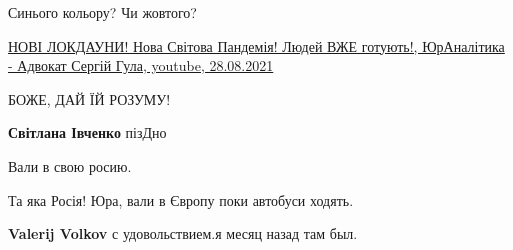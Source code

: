 \begin{itemize}
\begin{itemize}
Синього кольору?
Чи жовтого?
\end{itemize}

 
\href{https://youtu.be/nVaRQlgTcpk}{%
НОВІ ЛОКДАУНИ! Нова Світова Пандемія! Людей ВЖЕ готують!, %
ЮрАналітика - Адвокат Сергій Гула, youtube, 28.08.2021%
}

 
БОЖЕ, ДАЙ ЇЙ РОЗУМУ! 🙏🙏🙏

\begin{itemize}
 
\textbf{Світлана Івченко} пізДно
\end{itemize}

 
Вали в свою росию.

\begin{itemize}
 
Та яка Росія!
Юра, вали в Європу поки автобуси ходять.

 
\textbf{Valerij Volkov} с удовольствием.я месяц назад там был.


\end{itemize}
\end{itemize}
